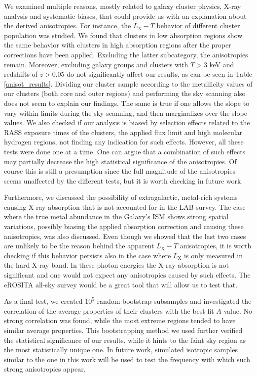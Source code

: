 \documentclass{aa}   %
\begin{document}
We examined multiple reasons, mostly related to galaxy cluster physics, X-ray analysis and systematic biases, that could provide us with an explanation about the derived anisotropies. For instance, the $L_{\text{X}}-T$ behavior of different cluster population was studied. We found that clusters in low absorption regions show the same behavior with clusters in high absorption regions after the proper corrections have been applied. Excluding the latter subcategory, the anisotropies remain. Moreover, excluding galaxy groups and clusters with $T>3$ keV and redshifts of $z>0.05$ do not significantly affect our results, as can be seen in Table \ref{anisot_results}. Dividing our cluster sample according to the metallicity values of our clusters (both core and outer regions) and performing the sky scanning also does not seem to explain our findings. The same is true if one allows the slope to vary within limits during the sky scanning, and then marginalizes over the slope values. We also checked if our analysis is biased by selection effects related to the RASS exposure times of the clusters, the applied flux limit and high molecular hydrogen regions, not finding any indication for such effects. However, all these tests were done one at a time. One can argue that a combination of such effects may partially decrease the high statistical significance of the anisotropies. Of course this is still a presumption since the full magnitude of the anisotropies seems unaffected by the different tests, but it is worth checking in future work.

Furthermore, we discussed the possibility of extragalactic, metal-rich systems causing X-ray absorption that is not accounted for in the LAB survey. The case where the true metal abundance in the Galaxy's ISM shows strong spatial variations, possibly biasing the applied absorption correction and causing these anisotropies, was also discussed. Even though we showed that the last two cases are unlikely to be the reason behind the apparent $L_{\text{X}}-T$ anisotropies, it is worth checking if this behavior persists also in the case where $L_{\text{X}}$ is only measured in the hard X-ray band. In these photon energies the X-ray absorption is not significant and one would not expect any anisotropies caused by such effects. The eROSITA all-sky survey would be a great tool that will allow us to test that.

As a final test, we created $10^5$ random bootstrap subsamples and investigated the correlation of the average properties of their clusters with the best-fit $A$ value. No strong correlation was found, while the most extreme regions tended to have similar average properties. This bootstrapping method we used further verified the statistical significance of our results, while it hints to the faint sky region as the most statistically unique one. In future work, simulated isotropic samples similar to the one in this work will be used to test the frequency with which such strong anisotropies appear.
\end{document}
